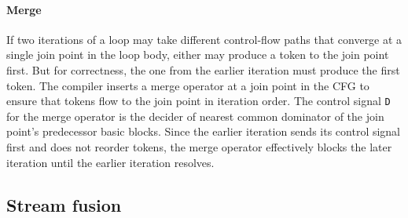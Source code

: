 \paragraph{Merge}
%
%
If two iterations of a loop may take different control-flow
paths that converge at a single join point in the loop body, either may
produce a token to the join point first.
% 
But for correctness, the one from the
earlier iteration must produce the first token.
%
The compiler inserts a merge operator at a join point in the CFG to ensure that 
tokens flow to the join point in iteration order.
%
The control signal {\tt D} for the merge operator is the decider of
nearest common dominator of the join point's predecessor basic blocks.
%
%
Since the earlier iteration sends its control signal first and \riptide does not reorder tokens, the merge operator effectively blocks the later iteration until the earlier iteration resolves. %
%

\subsection{Stream fusion}
\label{riptide:compiler:stream}

